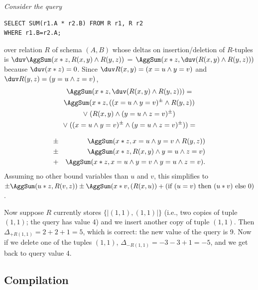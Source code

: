 \begin{example}\em
Consider the query
\begin{verbatim}
SELECT SUM(r1.A * r2.B) FROM R r1, R r2
WHERE r1.B=r2.A;
\end{verbatim}
over relation $R$ of schema $(A,B)$
whose deltas on insertion/deletion of
$R$-tuples is
$\duv \AggSum(x*z, R(x,y) \land R(y,z))$ =
$\AggSum(x*z, \duv (R(x,y) \land R(y,z)))$
because $\duv (x*z) = 0$. Since
$\duv R(x,y) = (x=u \land y=v)$ and
$\duv R(y,z) = (y=u \land z=v)$,%
%
\begin{multline*}
\AggSum(x*z, \duv (R(x,y) \land R(y,z))) = \\
\AggSum(x*z, ((x=u \land y=v)^\pm \land R(y,z)) \\
\lor\;
 (R(x,y) \land (y=u \land z=v)^\pm) \\
\lor\;
 ((x=u \land y=v)^\pm \land (y=u \land z=v)^\pm)) =
\end{multline*}

\vspace{-6mm}

\begin{eqnarray*}
&\pm& \AggSum(x*z, x=u \land y=v \land R(y,z)) \\
&\pm& \AggSum(x*z, R(x,y) \land y=u \land z=v) \\
&+  & \AggSum(x*z, x=u \land y=v \land y=u \land z=v).
\end{eqnarray*}
Assuming no other bound variables than $u$ and $v$,
this simplifies to
$\pm \AggSum(u*z, R(v,z))
 \pm \AggSum(x*v, (R(x,u))
 +   (\mbox{if }(u=v) \mbox{ then }(u*v)\mbox{ else }0)$.

Now suppose $R$ currently stores $\{\!| (1,1), (1,1) |\!\}$
(i.e., two copies of tuple $(1,1)$; the query has value 4)
and we insert another copy of tuple $(1,1)$.
Then $\Delta_{+R(1,1)} = 2 + 2 + 1 = 5$, which is
correct: the new value of the query is 9. Now if we delete one of the tuples
$(1,1)$,
$\Delta_{-R(1,1)} = -3 -3 +1 = -5$, and we get back to query value 4. 
\punto
\end{example}




\subsection{Compilation}



